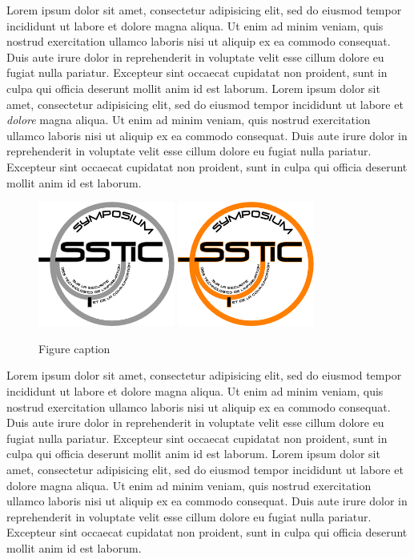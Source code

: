 Lorem ipsum dolor sit amet, consectetur adipisicing elit, sed do
eiusmod tempor incididunt ut labore et dolore magna aliqua. Ut enim ad
minim veniam, quis nostrud exercitation ullamco laboris nisi ut
aliquip ex ea commodo consequat. Duis aute irure dolor in
reprehenderit in voluptate velit esse cillum dolore eu fugiat nulla
pariatur. Excepteur sint occaecat cupidatat non proident, sunt in
culpa qui officia deserunt mollit anim id est laborum. Lorem ipsum
dolor sit amet, consectetur adipisicing elit, sed do eiusmod tempor
incididunt ut labore et \emph{dolore} magna aliqua. Ut enim ad minim
veniam, quis nostrud exercitation ullamco laboris nisi ut aliquip ex
ea commodo consequat. Duis aute irure dolor in reprehenderit in
voluptate velit esse cillum dolore eu fugiat nulla pariatur. Excepteur
sint occaecat cupidatat non proident, sunt in culpa qui officia
deserunt mollit anim id est laborum.


\begin{figure}[ht]
  \centering
  \ifssticbw
    \includegraphics[width=0.4\textwidth]{MyName/img/bw-archi}
  \else
    \includegraphics[width=0.4\textwidth]{MyName/img/archi}
  \fi
  \caption{Figure caption}
  \label{fig:myname:archi}
\end{figure}

Lorem ipsum dolor sit amet, consectetur adipisicing elit, sed do
eiusmod tempor incididunt ut labore et dolore magna aliqua. Ut enim ad
minim veniam, quis nostrud exercitation ullamco laboris nisi ut
aliquip ex ea commodo consequat. Duis aute irure dolor in
reprehenderit in voluptate velit esse cillum dolore eu fugiat nulla
pariatur. Excepteur sint occaecat cupidatat non proident, sunt in
culpa qui officia deserunt mollit anim id est laborum. Lorem ipsum
dolor sit amet, consectetur adipisicing elit, sed do eiusmod tempor
incididunt ut labore et dolore magna aliqua. Ut enim ad minim veniam,
quis nostrud exercitation ullamco laboris nisi ut aliquip ex ea
commodo consequat. Duis aute irure dolor in reprehenderit in voluptate
velit esse cillum dolore eu fugiat nulla pariatur. Excepteur sint
occaecat cupidatat non proident, sunt in culpa qui officia deserunt
mollit anim id est laborum.



